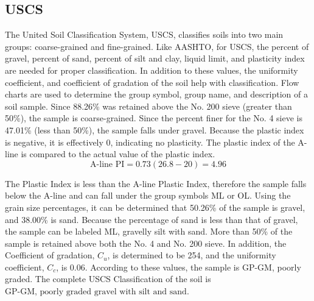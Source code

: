\documentclass{article}
\begin{document}
\subsection{USCS} 
\par The United Soil Classification System, USCS, classifies soils into two main groups: coarse-grained and fine-grained. Like AASHTO, for USCS, the percent of gravel, percent of sand, percent of silt and clay, liquid limit, and plasticity index are needed for proper classification. In addition to these values, the uniformity coefficient, and coefficient of gradation of the soil help with classification. Flow charts are used to determine the group symbol, group name, and description of a soil sample. Since 88.26\% was retained above the No. 200 sieve (greater than 50\%), the sample is coarse-grained. Since the percent finer for the No. 4 sieve is 47.01\% (less than 50\%), the sample falls under gravel. Because the plastic index is negative, it is effectively 0, indicating no plasticity. The plastic index of the A-line is compared to the actual value of the plastic index.  
\[\text{A-line PI} = 0.73(26.8-20) = 4.96\]
\par The Plastic Index is less than the A-line Plastic Index, therefore the sample falls below the A-line and can fall under the group symbols ML or OL. Using the grain size percentages, it can be determined that 50.26\% of the sample is gravel, and 38.00\% is sand. Because the percentage of sand is less than that of gravel, the sample can be labeled ML, gravelly silt with sand. More than 50\% of the sample is retained above both the No. 4 and No. 200 sieve. In addition, the Coefficient of gradation, $C_u$, is determined to be 254, and the uniformity coefficient, $C_c$, is 0.06. According to these values, the sample is GP-GM, poorly graded. The complete USCS Classification of the soil is $\boxed{\text{GP-GM, poorly graded gravel with silt and sand}}$.
\end{document}
